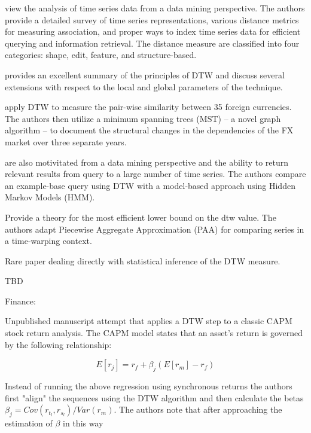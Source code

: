 \documentclass[12pt]{article}
\begin{document}
\parencite{ElsingAgon2012} view the analysis of time series data from a data mining perspective. The authors provide a detailed survey of time series representations, various distance metrics for measuring association, and proper ways to index time series data for efficient querying and information retrieval. The distance measure are classified into four categories: shape, edit, feature, and structure-based.


\parencite{Mueller2007} provides an excellent summary of the principles of DTW and discuss several extensions with respect to the local and global parameters of the technique.





\parencite{WangXieHanSun2012} apply DTW to measure the pair-wise similarity between 35 foreign currencies. The authors then utilize a minimum spanning trees (MST) -- a novel graph algorithm -- to document the structural changes in the dependencies of the FX market over three separate years.

\parencite{KotsifakosAthitsosPapapetrou_2011} are also motivitated from a data mining perspective and the ability to return relevant results from query to a large number of time series. The authors compare an example-base query using DTW with a model-based approach using Hidden Markov Models (HMM).

\parencite{KeoghRatanamahatana_2005} Provide a theory for the most efficient lower bound on the dtw value. The authors adapt Piecewise Aggregate Approximation (PAA) for comparing series in a time-warping context.

\parencite{DuyTakeuchi2023statistical} Rare paper dealing directly with statistical inference of the DTW measure.

\parencite{WangXieHanSun2012} TBD

Finance:

\parencite{HowardTalisAlexeev_2020} Unpublished manuscript attempt that applies a DTW step to a classic CAPM stock return analysis. The CAPM model states that an asset's return is governed by the following relationship:

\begin{equation}
    E[r_{j}] = r_{f} + \beta_{j} (E[r_{m}] - r_{f})
\end{equation}

Instead of running the above regression using  synchronous returns the authors first "align" the sequences using the DTW algorithm and then calculate the betas $\beta_{j} = Cov(r_{t_{l}}, r_{s_{l}}) / Var(r_{m})$. The authors note that after approaching the estimation of $\beta$ in this way
\end{document}
